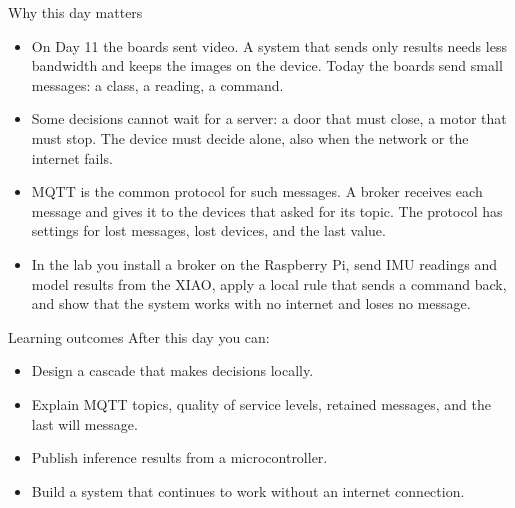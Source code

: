 \begin{frame}{Why this day matters}
  \begin{itemize}
    \item On Day 11 the boards sent video. A system that sends only results
          needs less bandwidth and keeps the images on the device. Today the
          boards send small messages: a class, a reading, a command.
    \item Some decisions cannot wait for a server: a door that must close, a
          motor that must stop. The device must decide alone, also when the
          network or the internet fails.
    \item MQTT is the common protocol for such messages. A broker receives
          each message and gives it to the devices that asked for its topic.
          The protocol has settings for lost messages, lost devices, and the
          last value.
    \item In the lab you install a broker on the Raspberry Pi, send IMU
          readings and model results from the XIAO, apply a local rule that
          sends a command back, and show that the system works with no
          internet and loses no message.
  \end{itemize}
\end{frame}

\begin{frame}{Learning outcomes}
  After this day you can:
  \begin{itemize}
    \item Design a cascade that makes decisions locally.
    \item Explain MQTT topics, quality of service levels, retained messages,
          and the last will message.
    \item Publish inference results from a microcontroller.
    \item Build a system that continues to work without an internet
          connection.
  \end{itemize}
\end{frame}
